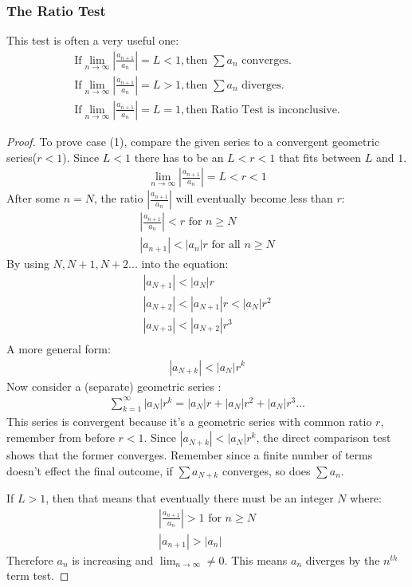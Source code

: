 \documentclass{article}
\begin{document}
\subsubsection{The Ratio Test}
This test is often a very useful one:
\begin{gather}
    \textrm{If} \lim_{n \to \infty} |\frac{a_{n+1}}{a_n}|= L < 1, \textrm{then } \sum a_n \textrm{ converges.}\\
    \textrm{If} \lim_{n \to \infty} |\frac{a_{n+1}}{a_n}|= L > 1, \textrm{then } \sum a_n \textrm{ diverges.}\\
    \textrm{If} \lim_{n \to \infty} |\frac{a_{n+1}}{a_n}|= L = 1, \textrm{then Ratio Test is inconclusive.}
\end{gather}
\begin{proof}
To prove case (1), compare the given series to a convergent geometric series($r < 1$). Since $L < 1$ there has to be an $L < r < 1$ that fits between $L$ and $1$.
\begin{gather*}
    \lim_{n \to \infty} |\frac{a_{n+1}}{a_n}|= L < r < 1
\end{gather*}
After some $n = N$, the ratio $|\frac{a_{n+1}}{a_n}|$ will eventually become less than $r$:
\begin{gather*}
    |\frac{a_{n+1}}{a_n}| < r \textrm{ for $n \geqslant N$}\\
    |a_{n+1}| < |a_n|r \textrm{ for all $n \geqslant N$}
\end{gather*}
By using $N,N+1,N+2...$ into the equation:
\begin{gather*}
    |a_{N+1}| < |a_N|r\\
    |a_{N+2}| < |a_{N+1}|r < |a_N|r^2\\
    |a_{N+3}| < |a_{N+2}|r^3\\
\end{gather*}
A more general form:
\begin{gather*}
    |a_{N+k}| < |a_N|r^k
\end{gather*}
Now consider a (separate) geometric series :
\begin{gather*}
    \sum_{k=1}^\infty |a_N|r^k = |a_N|r + |a_N|r^2 + |a_N|r^3...
\end{gather*}
This series is convergent because it's a geometric series with common ratio $r$, remember from before $r < 1$. Since $|a_{N+k}| < |a_N|r^k$, the direct comparison test shows that the former converges. Remember since a finite number of terms doesn't effect the final outcome, if $\sum a_{N+k}$ converges, so does $\sum a_n$.

If $L >1$, then that means that eventually there must be an integer $N$ where:
\begin{gather*}
    |\frac{a_{n+1}}{a_n}| > 1\textrm{ for $n \geqslant N$}\\
    |a_{n+1}| > |a_n|
\end{gather*}
Therefore $a_n$ is increasing and $\lim_{n \to \infty} \neq 0$. This means $a_n$ diverges by the $n^{th}$ term test.
\end{proof}
\end{document}
